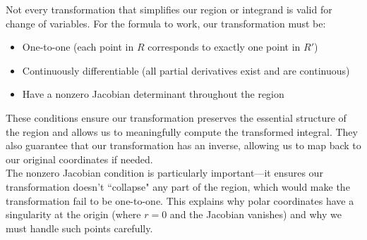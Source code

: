 \noindent Not every transformation that simplifies our region or integrand is valid for change of variables. For the formula to work, our transformation must be:
\begin{itemize}
    \item One-to-one (each point in $R$ corresponds to exactly one point in $R'$)
    \item Continuously differentiable (all partial derivatives exist and are continuous)
    \item Have a nonzero Jacobian determinant throughout the region
\end{itemize}

\noindent These conditions ensure our transformation preserves the essential structure of the region and allows us to meaningfully compute the transformed integral. They also guarantee that our transformation has an inverse, allowing us to map back to our original coordinates if needed. \\

\noindent The nonzero Jacobian condition is particularly important—it ensures our transformation doesn't ``collapse" any part of the region, which would make the transformation fail to be one-to-one. This explains why polar coordinates have a singularity at the origin (where $r = 0$ and the Jacobian vanishes) and why we must handle such points carefully.

